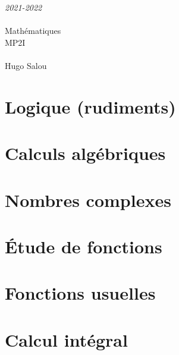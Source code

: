 \documentclass[a4paper]{report}
\newcommand{\chap}[2][0]{
	\setcounter{chapter}{#1 - 1}
	\chapter{#2}
	\renewcommand*\parttitle{#2}
}
\begin{document}
	\begin{titlepage}
		\begin{center}
			\vspace{10cm}
			{\Large \itshape 2021-2022}\\
			\vspace{3cm}
			\\
			\vspace{2mm}
			\vspace{0.5cm}
			{\HUGE Mathématiques}\\
			\vspace{0.5cm}
			{\fontsize{240pt}{260pt}\selectfont MP2I}\\
			\vspace{0.5cm}
			\\
			\vfill
			Hugo {\sc Salou}\\
		\end{center}
	\end{titlepage}

	{
		\lhead{}
		\renewcommand*\parttitle{Table des matières}
		\tableofcontents
	}



	{
		\chap[00]{Logique (rudiments)}
		\renewcommand{\cwd}{../chap00}
		
		
		
		
		
	}

	{
		\chap[01]{Calculs algébriques}
		\renewcommand{\cwd}{../chap01}
		
		
		
		
		
		
	}

	{
		\chap[02]{Nombres complexes}
		\renewcommand{\cwd}{../chap02}
		
		
		
		
		
	}

	{
		\chap[03]{Étude de fonctions}
		\renewcommand{\cwd}{../chap03}
		
		
		
	}

	{
		\chap[04]{Fonctions usuelles}
		\renewcommand{\cwd}{../chap04}
		
		
		
		
		
		
		
	}

	{
		\chap[05]{Calcul intégral}
		\renewcommand{\cwd}{../chap05}
		
	}
\end{document}
